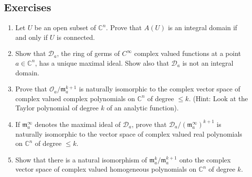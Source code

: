 \subsection*{Exercises}
\begin{enumerate}
\item Let $U$ be an open subset of $\mathbb C^n$. Prove that $A(U)$ is an integral domain if and only if $U$ is connected.
\item Show that $\mathcal D_a$, the ring of germs of $C^\infty$ complex valued functions at a point $a\in\mathbb C^n$, has a unique maximal ideal. Show also that $\mathcal D_a$ is not an integral domain.
\item Prove that $\mathcal O_a/\mathfrak m_a^{k+1}$ is naturally isomorphic to the complex vector space of complex valued complex polynomials on $\mathbb C^n$ of degree $\leq k$. (Hint: Look at the Taylor polynomial of degree $k$ of an analytic function).
\item If $\mathfrak m_a^\infty$ denotes the maximal ideal of $\mathcal D_a$, prove that $\mathcal D_a/(\mathfrak m_a^\infty)^{k+1}$ is naturally isomorphic to the vector space of complex valued real polynomials on $\mathbb C^n$ of degree $\leq k$.
\item Show that there is a natural isomorphism of $\mathfrak m_a^k/\mathfrak m_a^{k+1}$ onto the complex vector space of complex valued homogeneous polynomials on $\mathbb C^n$ of degree $k$.
\end{enumerate}
